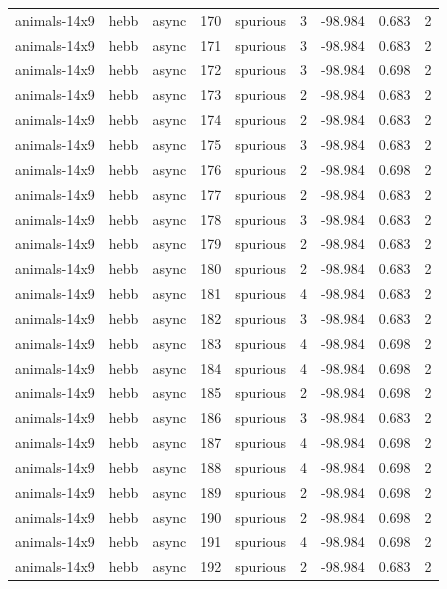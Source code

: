 \begin{tabular}{lllrlrrrr}
animals-14x9 & hebb & async & 170 & spurious & 3 & -98.984 & 0.683 & 2 \\
animals-14x9 & hebb & async & 171 & spurious & 3 & -98.984 & 0.683 & 2 \\
animals-14x9 & hebb & async & 172 & spurious & 3 & -98.984 & 0.698 & 2 \\
animals-14x9 & hebb & async & 173 & spurious & 2 & -98.984 & 0.683 & 2 \\
animals-14x9 & hebb & async & 174 & spurious & 2 & -98.984 & 0.683 & 2 \\
animals-14x9 & hebb & async & 175 & spurious & 3 & -98.984 & 0.683 & 2 \\
animals-14x9 & hebb & async & 176 & spurious & 2 & -98.984 & 0.698 & 2 \\
animals-14x9 & hebb & async & 177 & spurious & 2 & -98.984 & 0.683 & 2 \\
animals-14x9 & hebb & async & 178 & spurious & 3 & -98.984 & 0.683 & 2 \\
animals-14x9 & hebb & async & 179 & spurious & 2 & -98.984 & 0.683 & 2 \\
animals-14x9 & hebb & async & 180 & spurious & 2 & -98.984 & 0.683 & 2 \\
animals-14x9 & hebb & async & 181 & spurious & 4 & -98.984 & 0.683 & 2 \\
animals-14x9 & hebb & async & 182 & spurious & 3 & -98.984 & 0.683 & 2 \\
animals-14x9 & hebb & async & 183 & spurious & 4 & -98.984 & 0.698 & 2 \\
animals-14x9 & hebb & async & 184 & spurious & 4 & -98.984 & 0.698 & 2 \\
animals-14x9 & hebb & async & 185 & spurious & 2 & -98.984 & 0.698 & 2 \\
animals-14x9 & hebb & async & 186 & spurious & 3 & -98.984 & 0.683 & 2 \\
animals-14x9 & hebb & async & 187 & spurious & 4 & -98.984 & 0.698 & 2 \\
animals-14x9 & hebb & async & 188 & spurious & 4 & -98.984 & 0.698 & 2 \\
animals-14x9 & hebb & async & 189 & spurious & 2 & -98.984 & 0.698 & 2 \\
animals-14x9 & hebb & async & 190 & spurious & 2 & -98.984 & 0.698 & 2 \\
animals-14x9 & hebb & async & 191 & spurious & 4 & -98.984 & 0.698 & 2 \\
animals-14x9 & hebb & async & 192 & spurious & 2 & -98.984 & 0.683 & 2 \\

\end{tabular}
